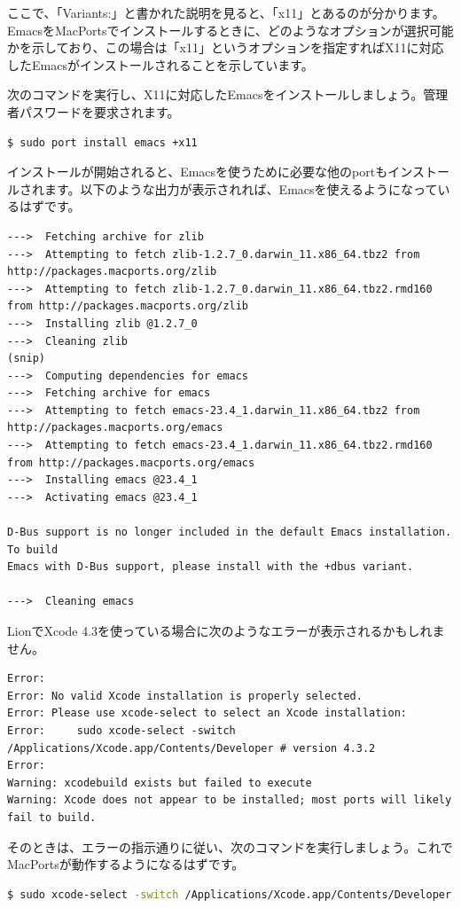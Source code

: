 ここで、「Variants:」と書かれた説明を見ると、「x11」とあるのが分かります。EmacsをMacPortsでインストールするときに、どのようなオプションが選択可能かを示しており、この場合は「x11」というオプションを指定すればX11に対応したEmacsがインストールされることを示しています。

次のコマンドを実行し、X11に対応したEmacsをインストールしましょう。管理者パスワードを要求されます。

\begin{lstlisting}[language=bash]
$ sudo port install emacs +x11
\end{lstlisting}

インストールが開始されると、Emacsを使うために必要な他のportもインストールされます。以下のような出力が表示されれば、Emacsを使えるようになっているはずです。

\begin{lstlisting}
--->  Fetching archive for zlib
--->  Attempting to fetch zlib-1.2.7_0.darwin_11.x86_64.tbz2 from http://packages.macports.org/zlib
--->  Attempting to fetch zlib-1.2.7_0.darwin_11.x86_64.tbz2.rmd160 from http://packages.macports.org/zlib
--->  Installing zlib @1.2.7_0
--->  Cleaning zlib
(snip)
--->  Computing dependencies for emacs
--->  Fetching archive for emacs
--->  Attempting to fetch emacs-23.4_1.darwin_11.x86_64.tbz2 from http://packages.macports.org/emacs
--->  Attempting to fetch emacs-23.4_1.darwin_11.x86_64.tbz2.rmd160 from http://packages.macports.org/emacs
--->  Installing emacs @23.4_1
--->  Activating emacs @23.4_1

D-Bus support is no longer included in the default Emacs installation. To build
Emacs with D-Bus support, please install with the +dbus variant.

--->  Cleaning emacs
\end{lstlisting}

LionでXcode 4.3を使っている場合に次のようなエラーが表示されるかもしれません。

\begin{lstlisting}
Error: 
Error: No valid Xcode installation is properly selected.
Error: Please use xcode-select to select an Xcode installation:
Error:     sudo xcode-select -switch /Applications/Xcode.app/Contents/Developer # version 4.3.2
Error: 
Warning: xcodebuild exists but failed to execute
Warning: Xcode does not appear to be installed; most ports will likely fail to build.
\end{lstlisting}

そのときは、エラーの指示通りに従い、次のコマンドを実行しましょう。これでMacPortsが動作するようになるはずです。
\begin{lstlisting}[language=bash]
$ sudo xcode-select -switch /Applications/Xcode.app/Contents/Developer
\end{lstlisting}

